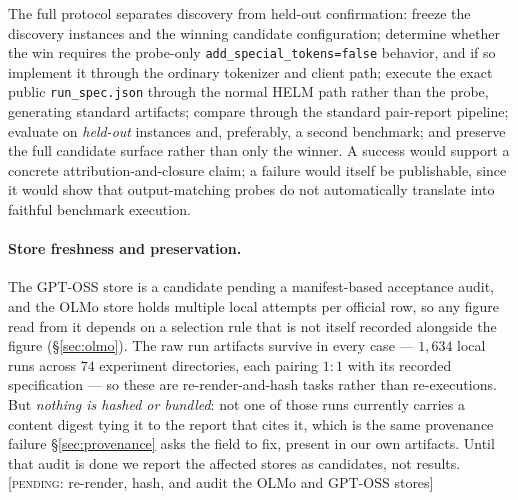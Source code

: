 The full protocol
separates discovery from held-out confirmation: freeze the discovery instances
and the winning candidate configuration; determine whether the win requires the
probe-only \texttt{add\_special\_tokens=false} behavior, and if so implement it
through the ordinary tokenizer and client path; execute the exact public
\texttt{run\_spec.json} through the normal HELM path rather than the probe,
generating standard artifacts; compare through the standard pair-report
pipeline; evaluate on \emph{held-out} instances and, preferably, a second
benchmark; and preserve the full candidate surface rather than only the winner.
A success would support a concrete attribution-and-closure claim; a failure would
itself be publishable, since it would show that output-matching probes do not
automatically translate into faithful benchmark execution.
\par\smallskip\noindent{}\par\smallskip

\paragraph{Store freshness and preservation.} The GPT-OSS store is a candidate
pending a manifest-based acceptance audit, and the OLMo store holds multiple local
attempts per official row, so any figure read from it depends on a selection rule
that is not itself recorded alongside the figure (\S\ref{sec:olmo}). The raw run artifacts survive
in every case --- $1{,}634$ local runs across $74$ experiment directories, each
pairing $1{:}1$ with its recorded specification --- so these are re-render-and-hash
tasks rather than re-executions. But \emph{nothing is hashed or bundled}: not one
of those runs currently carries a content digest tying it to the report that cites
it, which is the same provenance failure \S\ref{sec:provenance} asks the field to
fix, present in our own artifacts. Until that audit is done we report the affected
stores as candidates, not results.
{\color{orange}\textsf{\small[\textsc{pending}: re-render, hash, and audit the OLMo and
GPT-OSS stores]}}

